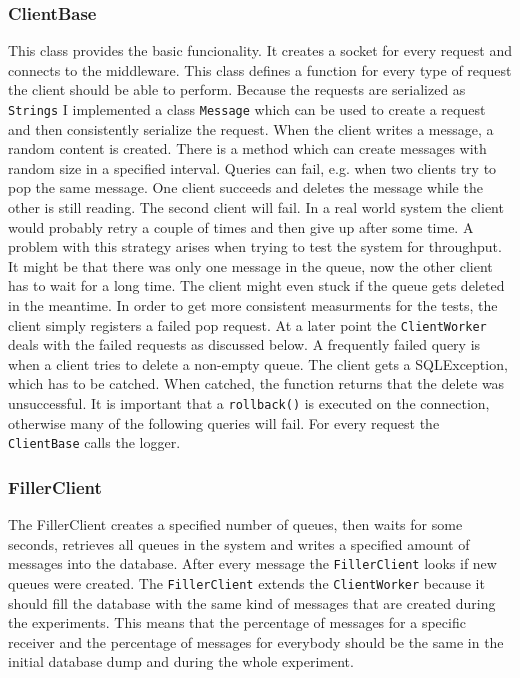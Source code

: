 \documentclass[
10pt, %
a4paper, %
oneside, %
headinclude,footinclude, %
BCOR5mm, %
]{scrartcl}
\begin{document}
\subsubsection{ClientBase}
This class provides the basic funcionality. It creates a socket for every request and connects to the middleware. This class defines a function for every type of request the client should be able to perform. Because the requests are serialized as \texttt{Strings} I implemented a class \texttt{Message} which can be used to create a request and then consistently serialize the request. When the client writes a message, a random content is created. There is a method which can create messages with random size in a specified interval.
Queries can fail, e.g. when two clients try to pop the same message. One client succeeds and deletes the message while the other is still reading. The second client will fail. In a real world system the client would probably retry a couple of times and then give up after some time. A problem with this strategy arises when trying to test the system for throughput. It might be that there was only one message in the queue, now the other client has to wait for a long time. The client might even stuck if the queue gets deleted in the meantime. In order to get more consistent measurments for the tests, the client simply registers a failed pop request. At a later point the \texttt{ClientWorker} deals with the failed requests as discussed below.
A frequently failed query is when a client tries to delete a non-empty queue. The client gets a SQLException, which has to be catched. When catched, the function returns that the delete was unsuccessful. It is important that a \texttt{rollback()} is executed on the connection, otherwise many of the following queries will fail.
For every request the \texttt{ClientBase} calls the logger.

\subsubsection{FillerClient}
The FillerClient creates a specified number of queues, then waits for some seconds, retrieves all queues in the system and writes a specified amount of messages into the database. After every message the \texttt{FillerClient} looks if new queues were created. The \texttt{FillerClient} extends the \texttt{ClientWorker} because it should fill the database with the same kind of messages that are created during the experiments. This means that the percentage of messages for a specific receiver and the percentage of messages for everybody should be the same in the initial database dump and during the whole experiment.
\end{document}
